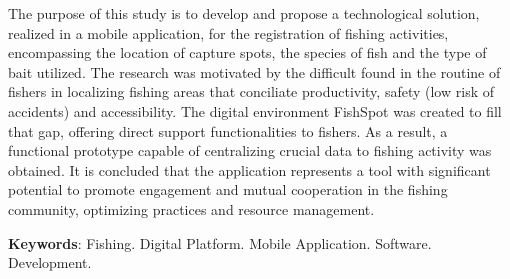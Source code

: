 
\begin{resumo}[ABSTRACT]
\begin{SingleSpacing}

The purpose of this study is to develop and propose a technological solution, realized in a mobile application, for the registration of fishing activities, encompassing the location of capture spots, the species of fish and the type of bait utilized. The research was motivated by the difficult found in the routine of fishers in localizing fishing areas that conciliate productivity, safety (low risk of accidents) and accessibility. The digital environment FishSpot was created to fill that gap, offering direct support functionalities to fishers. As a result, a functional prototype capable of centralizing crucial data to fishing activity was obtained. It is concluded that the application represents a tool with significant potential to promote engagement and mutual cooperation in the fishing community, optimizing practices and resource management.

\hfill \break
\textbf{Keywords}: Fishing. Digital Platform. Mobile Application. Software. Development.

\end{SingleSpacing}
\end{resumo}
